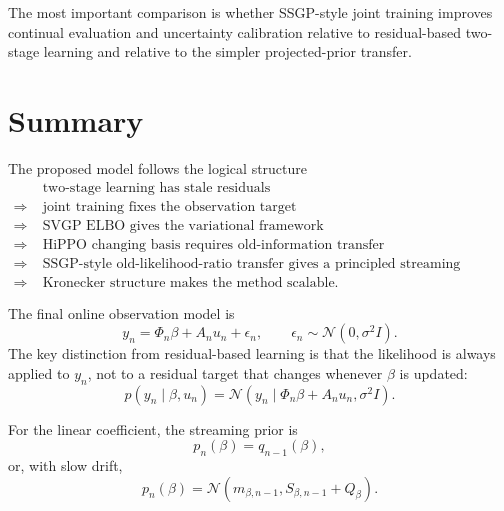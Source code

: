 \documentclass[12pt]{article}
\begin{document}
The most important comparison is whether SSGP-style joint training improves continual
evaluation and uncertainty calibration relative to residual-based two-stage learning and
relative to the simpler projected-prior transfer.

\section{Summary}
\label{sec:summary}

The proposed model follows the logical structure
\begin{equation}
\begin{aligned}
    &\text{two-stage learning has stale residuals} \\
    \Rightarrow\;&
    \text{joint training fixes the observation target} \\
    \Rightarrow\;&
    \text{SVGP ELBO gives the variational framework} \\
    \Rightarrow\;&
    \text{HiPPO changing basis requires old-information transfer} \\
    \Rightarrow\;&
    \text{SSGP-style old-likelihood-ratio transfer gives a principled streaming update} \\
    \Rightarrow\;&
    \text{Kronecker structure makes the method scalable.}
\end{aligned}
\end{equation}

The final online observation model is
\begin{equation}
    y_n
    =
    \Phi_n\beta
    +
    A_nu_n
    +
    \epsilon_n,
    \qquad
    \epsilon_n\sim\mathcal{N}(0,\sigma^2I).
\end{equation}
The key distinction from residual-based learning is that the likelihood is always applied
to \(y_n\), not to a residual target that changes whenever \(\beta\) is updated:
\begin{equation}
    p(y_n\mid \beta,u_n)
    =
    \mathcal{N}
    \left(
        y_n
        \mid
        \Phi_n\beta+A_nu_n,
        \sigma^2I
    \right).
\end{equation}

For the linear coefficient, the streaming prior is
\begin{equation}
    p_n(\beta)=q_{n-1}(\beta),
\end{equation}
or, with slow drift,
\begin{equation}
    p_n(\beta)
    =
    \mathcal{N}
    \left(
        m_{\beta,n-1},
        S_{\beta,n-1}+Q_\beta
    \right).
\end{equation}
\end{document}
